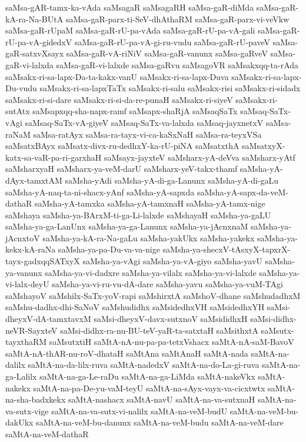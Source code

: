 {saMsa-gAR-tamx-ka-vAda
saMsagaR
saMsagaRH
saMsa-gaR-diMda
saMsa-gaR-kA-ra-Na-BUtA
saMsa-gaR-parx-ti-SeV-dhAthaRM
saMsa-gaR-parx-vi-veVkw
saMsa-gaR-rUpaM
saMsa-gaR-rU-pa-vAda
saMsa-gaR-rU-pa-vA-gali
saMsa-gaR-rU-pa-vA-gidedxV
saMsa-gaR-rU-pa-vA-gi-ru-vudu
saMsa-gaR-rU-paveV
saMsa-gaR-satxvXsayx
saMsa-gaR-vA-riNiV
saMsa-gaR-vanunx
saMsa-gaRveV
saMsa-gaR-vi-lalxda
saMsa-gaR-vi-lalxde
saMsa-gaRvu
saMsagoVR
saMsakxqq-ta-rAda
saMsakx-ri-sa-lapx-Da-ta-kakx-vanU
saMsakx-ri-sa-lapx-Duva
saMsakx-ri-sa-lapx-Du-vudu
saMsakx-ri-sa-lapxTaTx
saMsakx-ri-salu
saMsakx-risi
saMsakx-ri-sidadx
saMsakx-ri-si-dare
saMsakx-ri-si-da-re-punaH
saMsakx-ri-siyeV
saMsakx-ri-sutAtx
saMsapxqq-sha-napx-ramf
saMsapx-shaRjA
saMsaqSaTx
saMsaq-SaTx-vAgi
saMsaq-SaTx-vA-giyeV
saMsaq-SaTx-va-lalxda
saMsaq-jayxnetxV
saMsa-raNaM
saMsa-ratAyx
saMsa-ra-tayx-vi-ca-kaSxNaH
saMsa-ra-teyxVSa
saMsatxBAyx
saMsatx-divx-ru-dedhxY-ka-rU-piNA
saMsatxthA
saMsatxyX-katx-sa-vaR-pa-ri-garxhaH
saMsayx-jayxteV
saMsharx-yA-deVva
saMsharx-yAtf
saMsharxyaH
saMsharx-ya-veM-darU
saMsharx-yeV-takx-thamf
saMsha-yA-dAyx-tamxtAM
saMsha-yAdi
saMsha-yA-di-ga-Lanunx
saMsha-yA-di-gaLu
saMsha-yA-naq-ta-ni-shacx-yAnf
saMsha-yA-sapxda
saMsha-yA-sapx-da-veM-dathaR
saMsha-yA-tamxka
saMsha-yA-tamxnaH
saMsha-yA-tamx-nige
saMshaya
saMsha-ya-BArxM-ti-ga-Li-lalxde
saMshayaH
saMsha-ya-gaLU
saMsha-ya-ga-LanUnx
saMsha-ya-ga-Lanunx
saMsha-ya-jAcnxnaM
saMsha-ya-jAcnxtoV
saMsha-ya-kA-ra-Na-gaLu
saMsha-yakUkx
saMsha-yakekx
saMsha-ya-kekx-kA-raNa
saMsha-ya-pa-Du-va-va-nige
saMsha-ya-shecxV-tAsxyX-tapxrX-tayx-gadxqqSATxyX
saMsha-ya-vAgi
saMsha-ya-vA-giyo
saMsha-yavU
saMsha-ya-vanunx
saMsha-ya-vi-dadxre
saMsha-ya-vilalx
saMsha-ya-vi-lalxde
saMsha-ya-vi-lalx-deyU
saMsha-ya-vi-ru-vu-dA-dare
saMsha-yavu
saMsha-ya-vuM-TAgi
saMshayoV
saMshilx-SaTx-yoV-rapi
saMshirxtA
saMshoV-dhane
saMshudadhxM
saMshu-dadhx-dhi-SaNoV
saMshudidhx
saMsidedhxVH
saMsidedhxYH
saMsi-dheyxV-dA-tamxtavxM
saMsi-dheyxV-davx-sutxnoV
saMsididhxH
saMsi-didhx-neVR-SayxteV
saMsi-didhx-ra-nu-BU-teV-yaR-ta-satxtaH
saMsithxtA
saMsutx-tayxthaRM
saMsutxtiH
saMtA-nA-nu-pa-pa-tetxVshacx
saMtA-nA-saM-BavoV
saMtA-nA-thAR-nu-roV-dhataH
saMtAna
saMtAnaH
saMtA-nada
saMtA-na-dalilx
saMtA-na-da-lilx-ruva
saMtA-nadedxV
saMtA-na-do-La-gi-ruva
saMtA-na-ga-Lalilx
saMtA-na-ga-Le-raDu
saMtA-na-ga-LiMda
saMtA-nakeVkx
saMtA-nakekx
saMtA-na-pa-De-yu-vaM-teyU
saMtA-na-sAyx-vayx-va-cicxtwtx
saMtA-na-sha-badxkekx
saMtA-nashacx
saMtA-navU
saMtA-na-va-sutxnaH
saMtA-na-va-sutx-vige
saMtA-na-va-sutx-vi-nalilx
saMtA-na-veM-budU
saMtA-na-veM-bu-dakUkx
saMtA-na-veM-bu-danunx
saMtA-na-veM-budu
saMtA-na-veM-dare
saMtA-na-veM-dathaR
}
